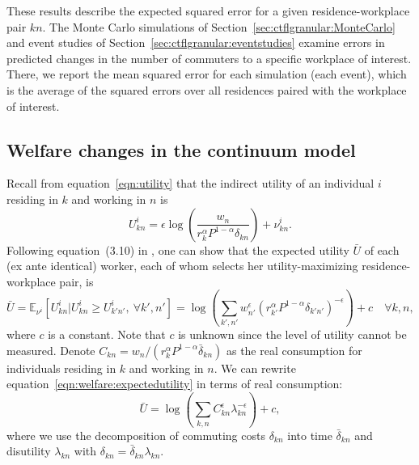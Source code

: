 \documentclass[11pt]{article}
\theoremstyle{definition}
\begin{document}
These results describe the expected squared error for a given residence-workplace pair $kn$.
The Monte Carlo simulations of Section~\ref{sec:ctflgranular:MonteCarlo} and event studies of Section~\ref{sec:ctflgranular:eventstudies}
examine errors in predicted changes in the number of commuters to a specific workplace of interest.
There, we report the mean squared error for each simulation (each event),
which is the average of the squared errors over all residences paired with the workplace of interest.

\subsection{Welfare changes in the continuum model}\label{sec:appendix:theory:welfare}
Recall from equation~\eqref{eqn:utility} that the indirect utility of an individual $i$ residing in $k$ and working in $n$ is
\begin{equation*}
  U_{kn}^i = \epsilon \log \left( \frac{w_n}{r_k^\alpha P^{1-\alpha} \delta_{kn}} \right) + \nu_{kn}^i.
\end{equation*}
Following equation~(3.10) in ,
one can show that the expected utility $\bar{U}$ of each (ex ante identical) worker,
each of whom selects her utility-maximizing residence-workplace pair, is
\begin{equation} \label{eqn:welfare:expectedutility}
  \bar{U} = \mathbb{E}_{\nu^i} \left[ U_{kn}^i | U_{kn}^i \geq U_{k'n'}^i, \ \forall k',n' \right] = \log \left( \sum_{k',n'} w_{n'}^\epsilon \left( r_{k'}^\alpha P^{1-\alpha} \delta_{k'n'} \right)^{-\epsilon} \right) + c \quad \forall k,n,
\end{equation}
where $c$ is a constant.
Note that $c$ is unknown since the level of utility cannot be measured.
Denote $C_{kn} = w_n / \left( r_k^{\alpha} P^{1-\alpha} \bar{\delta}_{kn} \right)$
as the real consumption for individuals residing in $k$ and working in $n$.
We can rewrite equation~\eqref{eqn:welfare:expectedutility} in terms of real consumption:
\begin{equation*}
  \bar{U} = \log \left( \sum_{k,n} C_{kn}^\epsilon \lambda_{kn}^{-\epsilon} \right) + c,
\end{equation*}
where we use the decomposition of commuting costs $\delta_{kn}$ into time $\bar{\delta}_{kn}$
and disutility $\lambda_{kn}$ with $\delta_{kn} = \bar{\delta}_{kn} \lambda_{kn}$.
\end{document}
